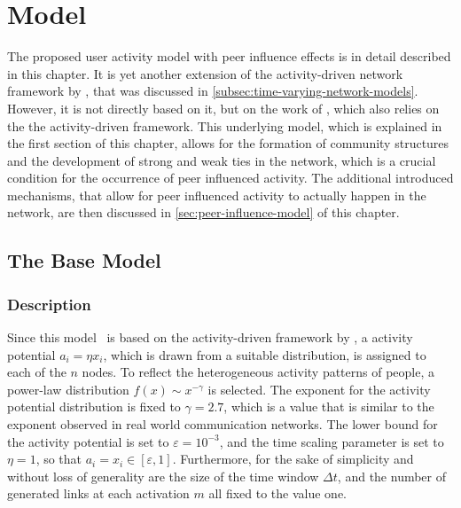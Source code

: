 \chapter{Model}

The proposed user activity model with peer influence effects is in detail described in this chapter.
It is yet another extension of the activity-driven network framework by \citet{Perra2012a}, that was discussed in \autoref{subsec:time-varying-network-models}.
However, it is not directly based on it, but on the work of \citet{Laurent2015}, which also relies on the the activity-driven framework.
This underlying model, which is explained in the first section of this chapter, allows for the formation of community structures and the development of strong and weak ties in the network, which is a crucial condition for the occurrence of peer influenced activity.
The additional introduced mechanisms, that allow for peer influenced activity to actually happen in the network, are then discussed in \autoref{sec:peer-influence-model} of this chapter.




\section{The Base Model}
\label{sec:base-model}


\subsection{Description}

Since this model~\cite{Laurent2015} is based on the activity-driven framework by \citet{Perra2012a}, a activity potential \( a_{i} = \eta x_{i}\),  which is drawn from a suitable distribution, is assigned to each of the \( n \) nodes.
To reflect the heterogeneous activity patterns of people, a power-law distribution \( f(x) \sim x^{-\gamma}\) is selected.
The exponent for the activity potential distribution is fixed to \( \gamma = 2.7 \), which is a value that is similar to the exponent observed in real world communication networks.
The lower bound for the activity potential is set to \( \varepsilon = 10^{-3} \), and the time scaling parameter is set to \( \eta = 1\), so that \( a_{i} = x_{i} \in [\varepsilon, 1] \).
Furthermore, for the sake of simplicity and without loss of generality are the size of the time window \( \Delta t \), and the number of generated links at each activation \( m \) all fixed to the value one.

